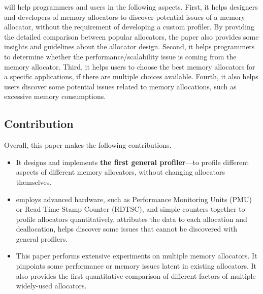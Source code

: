  
\MP{} will help programmers and users in the following aspects. First, it helps designers and developers of memory allocators to  discover potential issues of a memory allocator, without the requirement of developing a custom profiler. By providing the detailed comparison between popular allocators, the paper also provides some insights and guidelines about the allocator design. 
  Second, it helps programmers to determine whether the performance/scalability issue is coming from the memory allocator. Third, it helps users to choose the best memory allocators for a specific applications, if there are multiple choices available. Fourth, it also helps users discover some potential issues related to  memory allocations, such as excessive memory consumptions.  



\subsection*{Contribution}

Overall, this paper makes the following contributions. 

\begin{itemize}
\item It designs and implements \textbf{the first general profiler}--\MP{}--to profile different aspects of different memory allocators, without changing allocators themselves.  

\item \MP{} employs advanced hardware, such as Performance Monitoring Units (PMU) or Read Time-Stamp Counter (RDTSC), and simple counters together to profile allocators quantitatively. \MP{} attributes the data to each allocation and deallocation, helps discover some issues that cannot be discovered with general profilers.  


\item This paper performs extensive experiments on multiple memory allocators. It pinpoints some performance or memory issues latent in existing allocators. It also provides the first quantitative comparison of different factors of multiple widely-used allocators.  

\end{itemize} 


